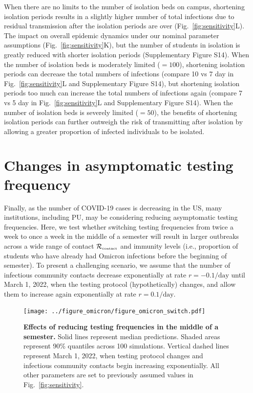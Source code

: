 \documentclass[12pt]{article}
\newcommand{\fref}[1]{Fig.~\ref{fig:#1}}
\newcommand{\Rx}[1]{\ensuremath{{\mathcal R}_{#1}}}
\newcommand{\Rc}{\Rx{\textrm{\tiny{contact}}}}
\begin{document}
When there are no limits to the number of isolation beds on campus, shortening isolation periods results in a slightly higher number of total infections due to residual transmission after the isolation periods are over (\fref{sensitivity}L). 
The impact on overall epidemic dynamics under our nominal parameter assumptions (\fref{sensitivity}K), but the number of students in isolation is greatly reduced with shorter isolation periods (Supplementary Figure S14).
When the number of isolation beds is moderately limited ($=100$), shortening isolation periods can decrease the total numbers of infections (compare 10 vs 7 day in \fref{sensitivity}L and Supplementary Figure S14), but shortening isolation periods too much can increase the total numbers of infections again (compare 7 vs 5 day in \fref{sensitivity}L and Supplementary Figure S14).
When the number of isolation beds is severely limited ($=50$), the benefits of shortening isolation periods can further outweigh the risk of transmitting after isolation by allowing a greater proportion of infected individuals to be isolated.

\section*{Changes in asymptomatic testing frequency}

Finally, as the number of COVID-19 cases is decreasing in the US, many institutions, including PU, may be considering reducing asymptomatic testing frequencies.
Here, we test whether switching testing frequencies from twice a week to once a week in the middle of a semester will result in larger outbreaks across a wide range of contact $\Rc$ and immunity levels (i.e., proportion of students who have already had Omicron infections before the beginning of semester).
To present a challenging scenario, we assume that the number of infectious community contacts decrease exponentially at rate $r=-0.1/\textrm{day}$ until March 1, 2022, when the testing protocol (hypothetically) changes, and allow them to increase again exponentially at rate $r=0.1/\textrm{day}$.

\begin{figure}[!th]
\texttt{[image: ../figure\_omicron/figure\_omicron\_switch.pdf]}
\caption{
\textbf{Effects of reducing testing frequencies in the middle of a semester.}
Solid lines represent median predictions.
Shaded areas represent 90\% quantiles across 100 simulations.
Vertical dashed lines represent March 1, 2022, when testing protocol changes and infectious community contacts begin increasing exponentially.
All other parameters are set to previously assumed values in \fref{sensitivity}.
\label{fig:switch}
}
\end{figure}
\end{document}
